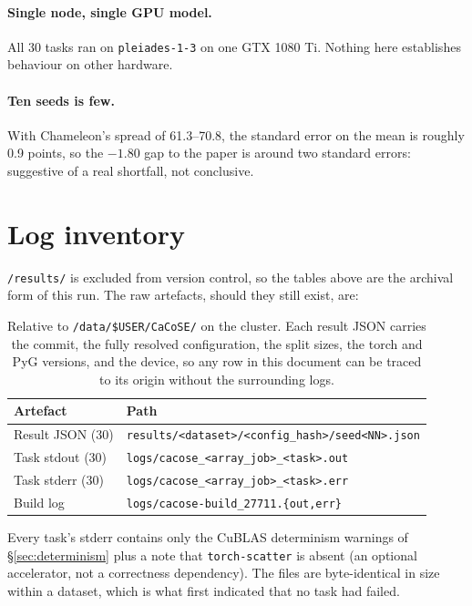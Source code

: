\documentclass[11pt,a4paper]{article}
\begin{document}
\paragraph{Single node, single GPU model.} All 30 tasks ran on \texttt{pleiades-1-3} on one GTX
1080 Ti. Nothing here establishes behaviour on other hardware.

\paragraph{Ten seeds is few.} With Chameleon's spread of 61.3--70.8, the standard error on the mean
is roughly 0.9 points, so the $-1.80$ gap to the paper is around two standard errors: suggestive of
a real shortfall, not conclusive.

\section{Log inventory}

\texttt{/results/} is excluded from version control, so the tables above are the archival form of
this run. The raw artefacts, should they still exist, are:

\begin{table}[!htbp]
\centering
\begin{tabular}{ll}
\toprule
Artefact & Path \\
\midrule
Result JSON (30) & \texttt{results/<dataset>/<config\_hash>/seed<NN>.json} \\
Task stdout (30) & \texttt{logs/cacose\_<array\_job>\_<task>.out} \\
Task stderr (30) & \texttt{logs/cacose\_<array\_job>\_<task>.err} \\
Build log & \texttt{logs/cacose-build\_27711.\{out,err\}} \\
\bottomrule
\end{tabular}
\caption{Relative to \texttt{/data/\$USER/CaCoSE/} on the cluster. Each result JSON carries the
commit, the fully resolved configuration, the split sizes, the torch and PyG versions, and the
device, so any row in this document can be traced to its origin without the surrounding logs.}
\end{table}

Every task's stderr contains only the CuBLAS determinism warnings of
\S\ref{sec:determinism} plus a note that \texttt{torch-scatter} is absent (an optional accelerator,
not a correctness dependency). The files are byte-identical in size within a dataset, which is what
first indicated that no task had failed.
\end{document}
